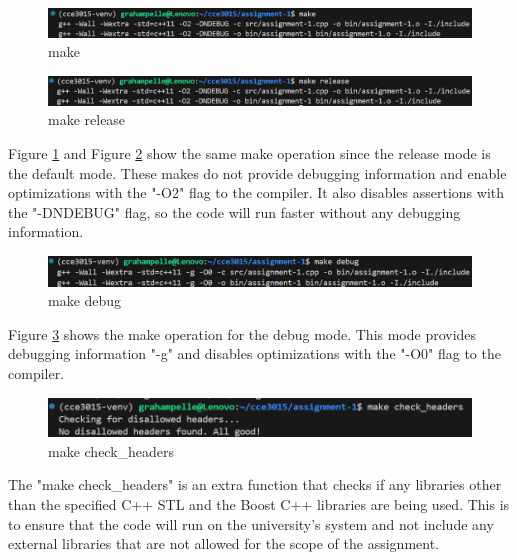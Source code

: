 \documentclass{article}
\begin{document}
\begin{figure}[H]
    \centering
    \includegraphics[width=1.2\textwidth]{assets/make.png}
    \caption{make}
    \label{fig5}
\end{figure}

\begin{figure}[H]
    \centering
    \includegraphics[width=1.2\textwidth]{assets/make_release.png}
    \caption{make release}
    \label{fig6}
\end{figure}

Figure \ref{fig5} and Figure \ref{fig6} show the same make operation since the release mode is the default mode. These makes do not provide debugging information and enable optimizations with the "-O2" flag to the compiler. It also disables assertions with the "-DNDEBUG" flag, so the code will run faster without any debugging information.\\

\begin{figure}[H]
    \centering
    \includegraphics[width=1.2\textwidth]{assets/make_debug.png}
    \caption{make debug}
    \label{fig7}
\end{figure}

Figure \ref{fig7} shows the make operation for the debug mode. This mode provides debugging information "-g" and disables optimizations with the "-O0" flag to the compiler.\\

\begin{figure}[H]
    \centering
    \includegraphics[width=1.2\textwidth]{assets/make_check_headers.png}
    \caption{make check\_headers}
    \label{fig8}
\end{figure}

The "make check\_headers" is an extra function that checks if any libraries other than the specified C++ STL and the Boost C++ libraries are being used. This is to ensure that the code will run on the university's system and not include any external libraries that are not allowed for the scope of the assignment.\\
\end{document}

